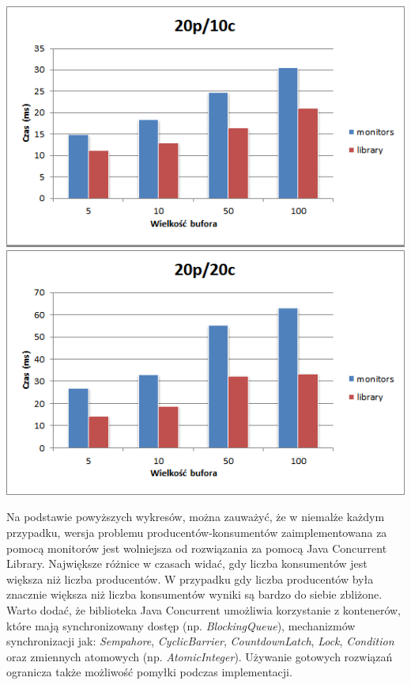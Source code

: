 \documentclass[12pt]{article}
\begin{document}
\begin{center}
    \includegraphics[width=\textwidth]{8.png}
    \includegraphics[width=\textwidth]{9.png}
    
\end{center}

\newpage
Na podstawie powyższych wykresów, można zauważyć, że w niemalże każdym przypadku, wersja problemu producentów-konsumentów zaimplementowana za pomocą monitorów jest wolniejsza od rozwiązania za pomocą Java Concurrent Library. Największe różnice w czasach widać, gdy liczba konsumentów jest większa niż liczba producentów.
W przypadku gdy liczba producentów była znacznie większa niż liczba konsumentów wyniki są bardzo do siebie zbliżone. 
\\

Warto dodać, że biblioteka Java Concurrent umożliwia korzystanie z kontenerów, które mają synchronizowany dostęp (np. \emph{BlockingQueue}), mechanizmów synchronizacji jak: \emph{Sempahore}, \emph{CyclicBarrier}, \emph{CountdownLatch}, \emph{Lock}, \emph{Condition} oraz zmiennych atomowych (np. \emph{AtomicInteger}). Używanie gotowych rozwiązań ogranicza także możliwość pomyłki podczas implementacji.
\end{document}
